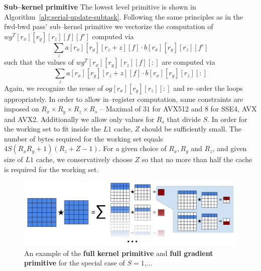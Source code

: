   {\bf Sub--kernel primitive} \quad The lowest level primitive is
  shown in Algorithm~\ref{alg:serial-update-subtask}.  Following the
  same principles as in the fwd-bwd pass' sub--kernel primitive we
  vectorize the computation of $wg^T[r_x][r_y][r_z][f][f']$ computed
  via {\small
  \[
  \sum_{z}
  a[r_x][r_y][r_z+z][f] \cdot b[r_x][r_y][r_z][f']
  \]
  } such that the values of $wg^T[r_x][r_y][r_z][f][:]$ are computed
  via {\small
  \[
  \sum_{z}
  a[r_x][r_y][r_z+z][f] \cdot b[r_x][r_y][r_z][:]
  \]
  } Again, we recognize the reuse of $og[r_x][r_y][r_z][:]$ and
  re--order the loops appropriately.  In order to allow in--register
  computation, same constraints are imposed on $R_x \times R_y \times
  R_z \times R_s$ -- Maximal of $31$ for AVX512 and $8$ for SSE4, AVX
  and AVX2.  Additionally we allow only values for $R_s$ that divide
  $S$.  In order for the working set to fit inside the $L1$ cache, $Z$
  should be sufficiently small.  The number of bytes required for the
  working set equals $4S(R_xR_y+1)(R_z+Z-1)$.  For a given choice of
  $R_x, R_y$ and $R_z$, and given size of $L1$ cache, we
  conservatively choose $Z$ so that no more than half the cache is
  required for the working set.

   \begin{figure}
     \centering
     \includegraphics[width=0.99\linewidth]{fig/update2}
     \caption{An example of the {\bf full kernel primitive} and {\bf
         full gradient primitive} for the special case of $S=1$,...}
     \label{fig:conv-decomposition}
   \end{figure}

